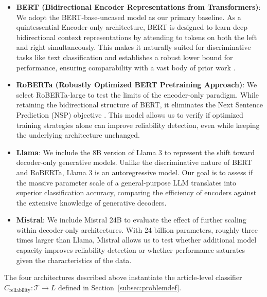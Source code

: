 \documentclass[journal]{IEEEtran}
\begin{document}
\begin{itemize}
    \item \textbf{BERT (Bidirectional Encoder Representations from Transformers)}: 
    We adopt the BERT-base-uncased model \cite{devlin2019bert} as our primary baseline. As a quintessential Encoder-only architecture, BERT is designed to learn deep bidirectional context representations by attending to tokens on both the left and right simultaneously. This makes it naturally suited for discriminative tasks like text classification and establishes a robust lower bound for performance, ensuring comparability with a vast body of prior work \cite{rogers2021primer}.

    \item \textbf{RoBERTa (Robustly Optimized BERT Pretraining Approach)}: 
    We select RoBERTa-large to test the limits of the encoder-only paradigm. While retaining the bidirectional structure of BERT, it eliminates the Next Sentence Prediction (NSP) objective  \cite{liu2019roberta}. This model allows us to verify if optimized training strategies alone can improve reliability detection, even while keeping the underlying architecture unchanged.

    \item \textbf{Llama}: 
    We include the 8B version of Llama 3 \cite{grattafiori2024llama} to represent the shift toward decoder-only generative models. Unlike the discriminative nature of BERT and RoBERTa, Llama 3 is an autoregressive model. Our goal is to assess if the massive parameter scale of a general-purpose LLM translates into superior classification accuracy, comparing the efficiency of encoders against the extensive knowledge of generative decoders.

    \item \textbf{Mistral}: 
    We include Mistral 24B \cite{jiang2024mixtral} to evaluate the effect of further scaling within decoder-only architectures. With 24 billion parameters, roughly three times larger than Llama, Mistral allows us to test whether additional model capacity improves reliability detection or whether performance saturates given the characteristics of the data.

\end{itemize}

The four architectures described above instantiate the article-level classifier \(C_{\text{reliability}}: \mathcal{T} \rightarrow L\) defined in Section~\ref{subsec:problemdef}. 
\end{document}
